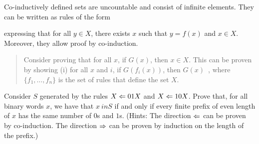 \begin{remark}
    Co-inductively defined sets are uncountable and consist of infinite elements.
    They can be written as rules of the form
    \begin{prooftree}
\end{prooftree}
   expressing that for all $y \in X$, there exists $x$ such that $y = f(x)$ and $x \in X$. Moreover, they allow proof by co-induction.
    \begin{quote}
        Consider proving that for all $x$, if $G(x)$, then $x \in X$.
		This can be proven by showing (i) for all $x$ and $i$, if $G(f_i(x))$, then $G(x)$ \,, where $\{f_1, \ldots, f_n\}$ is the set of rules that define the set $X$.
    \end{quote}
\end{remark}



\begin{exercise}
    Consider $S$ generated by the rules $X \simplied 01X$ and $X \simplied 10X$. 
	Prove that, for all binary words $x$, we have that $x\ in S$ if and only if every finite prefix of even length of $x$ has the same number of $0$s and $1$s.  
(Hints: The direction $\simplied$ can be proven by co-induction. The direction $\simplies$ can be proven by induction on the length of the prefix.)
\end{exercise}


